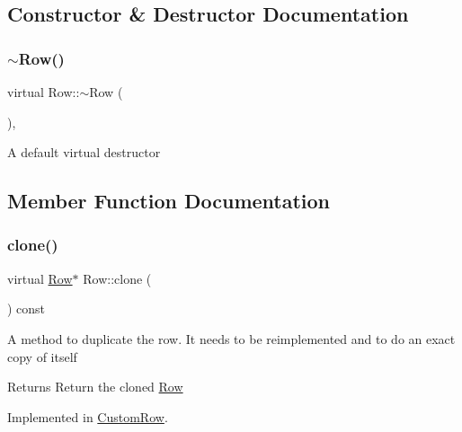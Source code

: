 \subsection{Constructor \& Destructor Documentation}
\mbox{\label{classRow_acce74b5e3df47d61a3a22388f6c1f552}} 
\subsubsection{\texorpdfstring{$\sim$\+Row()}{~Row()}}
{\footnotesize\ttfamily virtual Row\+::$\sim$\+Row (\begin{DoxyParamCaption}{ }\end{DoxyParamCaption})\hspace{0.3cm}{\ttfamily [virtual]}, {\ttfamily [default]}}

A default virtual destructor 

\subsection{Member Function Documentation}
\mbox{\label{classRow_ae3e9c3aaa17ebc4f0e280cdec722440a}} 
\subsubsection{\texorpdfstring{clone()}{clone()}}
{\footnotesize\ttfamily virtual \mbox{\hyperlink{classRow}{Row}}$\ast$ Row\+::clone (\begin{DoxyParamCaption}{ }\end{DoxyParamCaption}) const\hspace{0.3cm}{\ttfamily [pure virtual]}}

A method to duplicate the row. It needs to be reimplemented and to do an exact copy of itself

\begin{DoxyReturn}{Returns}
Return the cloned \mbox{\hyperlink{classRow}{Row}} 
\end{DoxyReturn}


Implemented in \mbox{\hyperlink{classCustomRow_a9d3c1b6bda5e63de382cc4a2aa29210d}{Custom\+Row}}.

\mbox{\label{classRow_a851b728fa55ecb26f8ebbc87e614581b}} 
